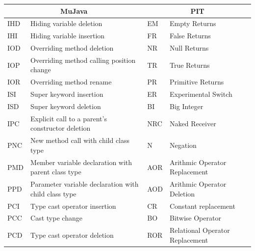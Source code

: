 \documentclass[conference,draftclsnofoot,onecolumn]{IEEEtran}
\begin{document}
\begin{table}[ht]
\centering
\begin{tabular}{|l|l|l|l|}
\hline
\multicolumn{2}{|c|}{\textbf{ MuJava}}                           & \multicolumn{2}{|c|}{\textbf{PIT}}                      \\ \hline
IHD & Hiding variable deletion                                  & EM                    & Empty Returns                   \\ \hline
IHI & Hiding variable   insertion                               & FR                    & False Returns                   \\ \hline
IOD & Overriding method   deletion                              & NR                    & Null Returns                    \\ \hline
IOP & Overriding method   calling position change               & TR                    & True Returns                    \\ \hline
IOR & Overriding method   rename                                & PR                    & Primitive Returns               \\ \hline
ISI & Super keyword insertion                                   & ER                    & Experimental Switch             \\ \hline
ISD & Super keyword deletion                                    & BI                    & Big Integer                     \\ \hline
IPC & Explicit call to a   parent’s constructor deletion        & NRC                   & Naked Receiver                  \\ \hline
PNC & New method call with   child class type                   & N                     & Negation                        \\ \hline
PMD & Member variable   declaration with parent class type      & AOR                   & Arithmic Operator Replacement   \\ \hline
PPD & Parameter variable   declaration with child class type    & AOD                   & Arithmic Operator Deletion      \\ \hline
PCI & Type cast operator   insertion                            & CR                    & Constant replacement            \\ \hline
PCC & Cast type change                                          & BO                    & Bitwise Operator                \\ \hline
PCD & Type cast operator   deletion                             & ROR                   & Relational Operator Replacement \\ \hline

\end{tabular}
\end{table}
\end{document}
